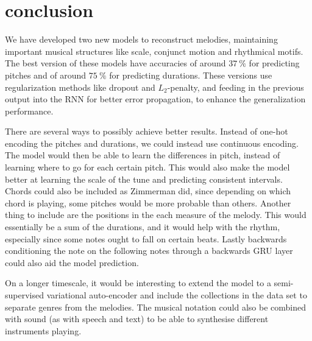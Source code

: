 \section{conclusion}
\label{sec:conclusion}

We have developed two new models to reconstruct melodies, maintaining important musical structures like scale, conjunct motion and rhythmical motifs. 
The best version of these models have accuracies of around $\SI{37}{\%}$ for predicting pitches and of around $\SI{75}{\%}$ for predicting durations.
These versions use regularization methods like dropout and $L_2$-penalty, and feeding in the previous output into the RNN for better error propagation, to enhance the generalization performance. 

There are several ways to possibly achieve better results.
Instead of one-hot encoding the pitches and durations, we could instead use continuous encoding.
The model would then be able to learn the differences in pitch, instead of learning where to go for each certain pitch.
This would also make the model better at learning the scale of the tune and predicting consistent intervals. 
Chords could also be included as Zimmerman \cite{Zimmerman2016} did, since depending on which chord is playing, some pitches would be more probable than others.
Another thing to include are the positions in the each measure of the melody. This would essentially be a sum of the durations, and it would help with the rhythm, especially since some notes ought to fall on certain beats.
Lastly backwards conditioning the note on the following notes through a backwards GRU layer could also aid the model prediction.

On a longer timescale, it would be interesting to extend the model to a semi-supervised variational auto-encoder and include the collections in the data set to separate genres from the melodies.
The musical notation could also be combined with sound (as with speech and text) to be able to synthesise different instruments playing.

